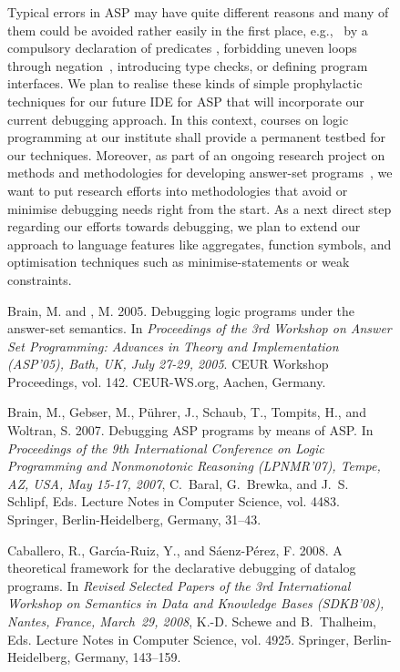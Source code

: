 \documentclass{tlp}
\newcommand{\egc}{e.g.,\ }
\begin{document}
\begin{figure}[t]
\begin{small}
Typical errors in ASP may have quite different reasons and
many of them could be avoided rather easily in the first place, \egc 
by a compulsory declaration of predicates \cite{brain05},
forbidding uneven loops through negation~\cite{syrjaenen06}, 
introducing type checks, or  defining
program interfaces. 
We plan to realise these kinds of simple prophylactic techniques for our future IDE for ASP that will incorporate our current debugging approach.
In this context,  courses on logic programming at our institute shall provide a permanent testbed for our techniques.
Moreover, as part of an ongoing research project on methods and methodologies for developing answer-set programs~\cite{mmdasp}, we want to put research efforts into methodologies that avoid or minimise debugging needs right from the start.
As a next direct step regarding our  efforts towards debugging,
we plan to extend our approach to language features like aggregates, function symbols, and optimisation techniques such as minimise-statements or weak constraints.






\begin{thebibliography}{}

{\sc Brain, M.} {\sc and} {, M.} 2005.
\newblock Debugging logic programs under the answer-set semantics.
\newblock In {\em Proceedings of the 3rd Workshop on Answer Set Programming:
  Advances in Theory and Implementation {\rm (}ASP'05{\rm )}, Bath, UK, July
  27-29, 2005}. CEUR Workshop Proceedings, vol. 142. CEUR-WS.org, Aachen,
  Germany.

{\sc Brain, M.}, {\sc Gebser, M.}, {\sc P{\"u}hrer, J.}, {\sc Schaub, T.}, {\sc
  Tompits, H.}, {\sc and} {\sc Woltran, S.} 2007.
\newblock Debugging {ASP} programs by means of {ASP}.
\newblock In {\em Proceedings of the 9th International Conference on Logic
  Programming and Nonmonotonic Reasoning {\rm (}LPNMR'07{\rm )}, Tempe, {AZ},
  {USA}, May 15-17, 2007}, {C.~Baral}, {G.~Brewka}, {and} {J.~S. Schlipf}, Eds.
  Lecture Notes in Computer Science, vol. 4483. Springer, Berlin-Heidelberg,
  Germany, 31--43.

{\sc Caballero, R.}, {\sc Garc\'{\i}a-Ruiz, Y.}, {\sc and} {\sc
  S{\'a}enz-P{\'e}rez, F.} 2008.
\newblock A theoretical framework for the declarative debugging of datalog
  programs.
\newblock In {\em Revised Selected Papers of the 3rd International Workshop on
  Semantics in Data and Knowledge Bases {\rm (}SDKB'08{\rm )}, Nantes, France,
  March~29, 2008}, {K.-D. Schewe} {and} {B.~Thalheim}, Eds. Lecture Notes in
  Computer Science, vol. 4925. Springer, Berlin-Heidelberg, Germany, 143--159.


\end{thebibliography}
\end{small}
\end{figure}
\end{document}
